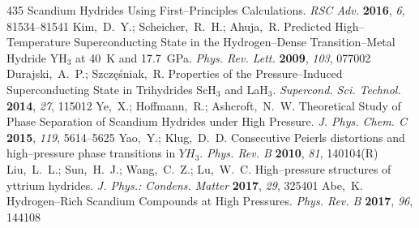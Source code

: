 \documentclass[12pt,letterpaper,oneside]{article}
\begin{document}
\begin{mcitethebibliography}{435}
  Scandium Hydrides Using First--Principles Calculations. \emph{RSC Adv.}
  \textbf{2016}, \emph{6}, 81534--81541\relax
\mciteBstWouldAddEndPuncttrue
\mciteSetBstMidEndSepPunct{\mcitedefaultmidpunct}
{\mcitedefaultendpunct}{\mcitedefaultseppunct}\relax
\EndOfBibitem
{}
Kim,~D.~Y.; Scheicher,~R.~H.; Ahuja,~R. Predicted High--Temperature
  Superconducting State in the Hydrogen--Dense Transition--Metal Hydride
  ${\mathrm{YH}}_{3}$ at 40~K and 17.7~GPa. \emph{Phys. Rev. Lett.}
  \textbf{2009}, \emph{103}, 077002\relax
\mciteBstWouldAddEndPuncttrue
\mciteSetBstMidEndSepPunct{\mcitedefaultmidpunct}
{\mcitedefaultendpunct}{\mcitedefaultseppunct}\relax
\EndOfBibitem
{}
Durajski,~A.~P.; Szcz{\k e}{\'s}niak,~R. Properties of the Pressure--Induced
  Superconducting State in Trihydrides ScH$_3$ and LaH$_3$. \emph{Supercond.
  Sci. Technol.} \textbf{2014}, \emph{27}, 115012\relax
\mciteBstWouldAddEndPuncttrue
\mciteSetBstMidEndSepPunct{\mcitedefaultmidpunct}
{\mcitedefaultendpunct}{\mcitedefaultseppunct}\relax
\EndOfBibitem
{}
Ye,~X.; Hoffmann,~R.; Ashcroft,~N.~W. Theoretical Study of Phase Separation of
  Scandium Hydrides under High Pressure. \emph{J. Phys. Chem. C} \textbf{2015},
  \emph{119}, 5614--5625\relax
\mciteBstWouldAddEndPuncttrue
\mciteSetBstMidEndSepPunct{\mcitedefaultmidpunct}
{\mcitedefaultendpunct}{\mcitedefaultseppunct}\relax
\EndOfBibitem
{}
Yao,~Y.; Klug,~D.~D. Consecutive Peierls distortions and high--pressure phase
  transitions in $YH_{3}$. \emph{Phys. Rev. B} \textbf{2010}, \emph{81},
  140104(R)\relax
\mciteBstWouldAddEndPuncttrue
\mciteSetBstMidEndSepPunct{\mcitedefaultmidpunct}
{\mcitedefaultendpunct}{\mcitedefaultseppunct}\relax
\EndOfBibitem
{}
Liu,~L.~L.; Sun,~H.~J.; Wang,~C.~Z.; Lu,~W.~C. High--pressure structures of
  yttrium hydrides. \emph{J. Phys.: Condens. Matter} \textbf{2017}, \emph{29},
  325401\relax
\mciteBstWouldAddEndPuncttrue
\mciteSetBstMidEndSepPunct{\mcitedefaultmidpunct}
{\mcitedefaultendpunct}{\mcitedefaultseppunct}\relax
\EndOfBibitem
{}
Abe,~K. Hydrogen--Rich Scandium Compounds at High Pressures. \emph{Phys. Rev.
  B} \textbf{2017}, \emph{96}, 144108\relax
\mciteBstWouldAddEndPuncttrue
\mciteSetBstMidEndSepPunct{\mcitedefaultmidpunct}
{\mcitedefaultendpunct}{\mcitedefaultseppunct}\relax

\end{mcitethebibliography}
\end{document}
